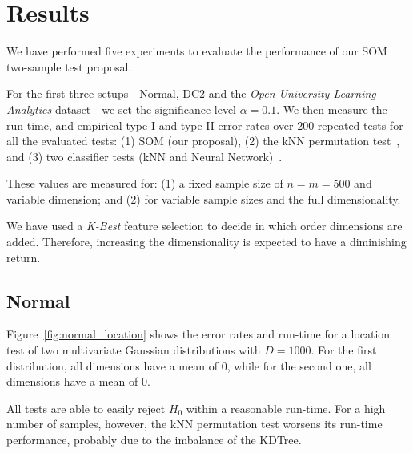 \section{Results}
\label{sec:som_results}

We have performed five experiments to evaluate the performance of our SOM
two-sample test proposal.

For the first three setups - Normal, DC2 and the \emph{Open University Learning Analytics} dataset
- we set the significance level $\alpha = 0.1$. We then measure the run-time, and empirical 
type I and type II error rates over $200$ repeated tests for all the evaluated
tests: (1) SOM (our proposal), (2) the kNN permutation test~\cite{Schilling1986b},
and (3) two classifier tests (kNN and Neural Network)~\cite{lopez2016revisiting}.

These values are measured for: (1) a fixed sample size of $n = m = 500$ and variable dimension;
and (2) for variable sample sizes and the full dimensionality.

We have used a \emph{K-Best} feature selection to decide in which order dimensions are added.
Therefore, increasing the dimensionality is expected to have a diminishing return.

\subsection{Normal}
Figure~\ref{fig:normal_location} shows the error rates and run-time for a location
test of two multivariate Gaussian distributions with $D=1000$. For the first distribution,
all dimensions have a mean of $0$, while for the second one, all dimensions have a mean of $0$.

All tests are able to easily reject $H_0$ within a reasonable run-time. For
a high number of samples, however, the kNN permutation test worsens its run-time performance,
probably due to the imbalance of the KDTree.

